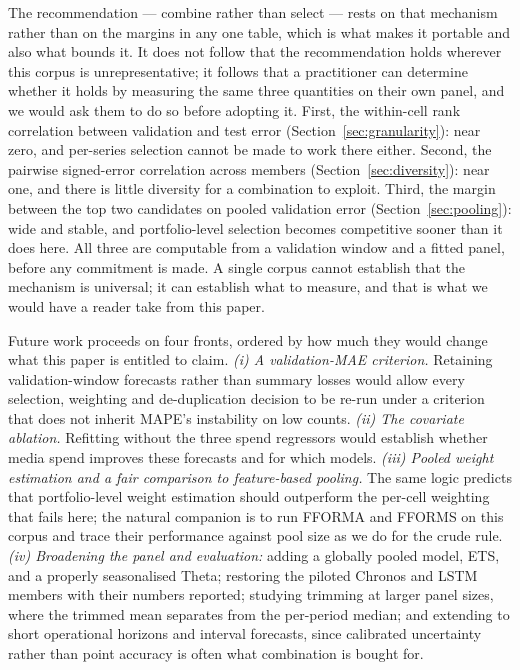 \documentclass[11pt]{article}
\begin{document}
The recommendation --- combine rather than select --- rests on that mechanism rather than on the margins in any one table, which is what makes it portable and also what bounds it. It does not follow that the recommendation holds wherever this corpus is unrepresentative; it follows that a practitioner can determine whether it holds by measuring the same three quantities on their own panel, and we would ask them to do so before adopting it. First, the within-cell rank correlation between validation and test error (Section~\ref{sec:granularity}): near zero, and per-series selection cannot be made to work there either. Second, the pairwise signed-error correlation across members (Section~\ref{sec:diversity}): near one, and there is little diversity for a combination to exploit. Third, the margin between the top two candidates on pooled validation error (Section~\ref{sec:pooling}): wide and stable, and portfolio-level selection becomes competitive sooner than it does here. All three are computable from a validation window and a fitted panel, before any commitment is made. A single corpus cannot establish that the mechanism is universal; it can establish what to measure, and that is what we would have a reader take from this paper.

Future work proceeds on four fronts, ordered by how much they would change what this paper is entitled to claim. \emph{(i) A validation-MAE criterion.} Retaining validation-window forecasts rather than summary losses would allow every selection, weighting and de-duplication decision to be re-run under a criterion that does not inherit MAPE's instability on low counts. \emph{(ii) The covariate ablation.} Refitting without the three spend regressors would establish whether media spend improves these forecasts and for which models. \emph{(iii) Pooled weight estimation and a fair comparison to feature-based pooling.} The same logic predicts that portfolio-level weight estimation should outperform the per-cell weighting that fails here; the natural companion is to run FFORMA and FFORMS on this corpus and trace their performance against pool size as we do for the crude rule. \emph{(iv) Broadening the panel and evaluation:} adding a globally pooled model, ETS, and a properly seasonalised Theta; restoring the piloted Chronos and LSTM members with their numbers reported; studying trimming at larger panel sizes, where the trimmed mean separates from the per-period median; and extending to short operational horizons and interval forecasts, since calibrated uncertainty rather than point accuracy is often what combination is bought for.
\end{document}
